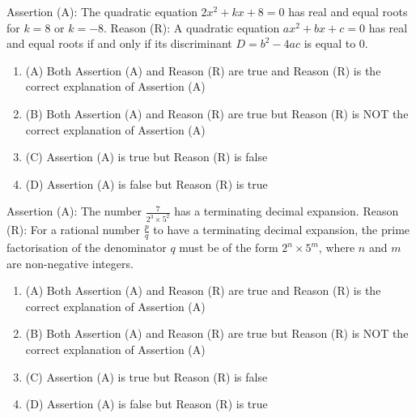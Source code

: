 \documentclass[12pt,a4paper]{exam}
\begin{document}
\begin{questions}
\question[1] Assertion (A): The quadratic equation $2x^2 + kx + 8 = 0$ has real and equal roots for $k = 8$ or $k = -8$. 
Reason (R): A quadratic equation $ax^2 + bx + c = 0$ has real and equal roots if and only if its discriminant $D = b^2 - 4ac$ is equal to $0$.
\begin{enumerate}[label=(\Alph*)]
  \item (A) Both Assertion (A) and Reason (R) are true and Reason (R) is the correct explanation of Assertion (A)
  \item (B) Both Assertion (A) and Reason (R) are true but Reason (R) is NOT the correct explanation of Assertion (A)
  \item (C) Assertion (A) is true but Reason (R) is false
  \item (D) Assertion (A) is false but Reason (R) is true
\end{enumerate}
\vspace{0.15cm}

\question[1] Assertion (A): The number $\frac{7}{2^3 \times 5^2}$ has a terminating decimal expansion. Reason (R): For a rational number $\frac{p}{q}$ to have a terminating decimal expansion, the prime factorisation of the denominator $q$ must be of the form $2^n \times 5^m$, where $n$ and $m$ are non-negative integers.
\begin{enumerate}[label=(\Alph*)]
  \item (A) Both Assertion (A) and Reason (R) are true and Reason (R) is the correct explanation of Assertion (A)
  \item (B) Both Assertion (A) and Reason (R) are true but Reason (R) is NOT the correct explanation of Assertion (A)
  \item (C) Assertion (A) is true but Reason (R) is false
  \item (D) Assertion (A) is false but Reason (R) is true
\end{enumerate}
\vspace{0.15cm}


\end{questions}
\end{document}
